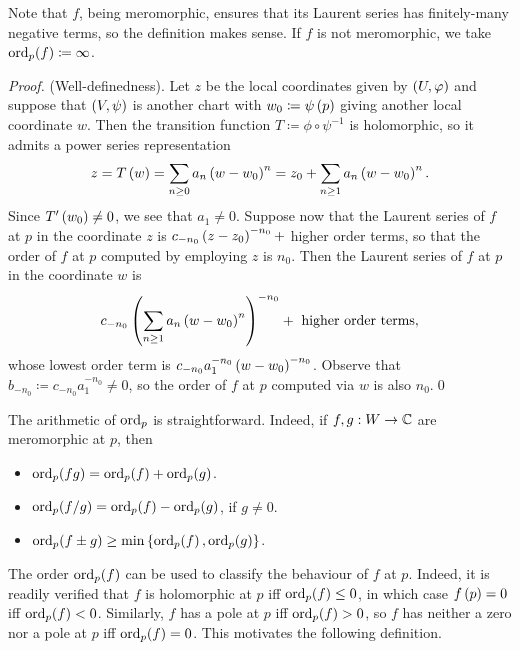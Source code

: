 \documentclass[../Moduli_Spaces_of_Riemann_Surfaces.tex]{subfiles}
\begin{document}
    \begin{remark}
        Note that $f$, being meromorphic, ensures that its Laurent series has finitely-many negative terms, so the definition makes sense. If $f$ is not meromorphic, we take $\operatorname{ord}_p\!\left(f\right)\coloneqq\infty$.\exqed
    \end{remark}
    \begin{proof}
        (Well-definedness). Let $z$ be the local coordinates given by $\left(U,\varphi\right)$ and suppose that $\left(V,\psi\right)$ is another chart with $w_0\coloneqq\psi\left(p\right)$ giving another local coordinate $w$. Then the transition function $T\coloneqq\phi\circ\psi^{-1}$ is holomorphic, so it admits a power series representation
        \begin{equation*}
            z=T\left(w\right)=\sum_{n\geq0}a_n\left(w-w_0\right)^n=z_0+\sum_{n\geq1}a_n\left(w-w_0\right)^n.
        \end{equation*}
        Since $T'\left(w_0\right)\neq0$, we see that $a_1\neq0$. Suppose now that the Laurent series of $f$ at $p$ in the coordinate $z$ is $c_{-n_0}\left(z-z_0\right)^{-n_0}+$ higher order terms, so that the order of $f$ at $p$ computed by employing $z$ is $n_0$. Then the Laurent series of $f$ at $p$ in the coordinate $w$ is
        \begin{equation*}
            c_{-n_0}\left(\sum_{n\geq1}a_n\left(w-w_0\right)^n\right)^{-n_0}+\textrm{ higher order terms},
        \end{equation*}
        whose lowest order term is $c_{-n_0}a_1^{-n_0}\left(w-w_0\right)^{-n_0}$. Observe that $b_{-n_0}\coloneqq c_{-n_0}a_1^{-n_0}\neq0$, so the order of $f$ at $p$ computed via $w$ is also $n_0$.\qed
    \end{proof}
    \begin{remark}
        The arithmetic of $\operatorname{ord}_p$ is straightforward. Indeed, if $f,g:W\to\mathbb{C}$ are meromorphic at $p$, then
        \begin{itemize}
            \item $\operatorname{ord}_p\!\left(fg\right)=\operatorname{ord}_p\!\left(f\right)+\operatorname{ord}_p\!\left(g\right)$.
                \vspace{-0.05in}
            \item $\operatorname{ord}_p\!\left(f/g\right)=\operatorname{ord}_p\!\left(f\right)-\operatorname{ord}_p\!\left(g\right)$, if $g\neq0$.
                \vspace{-0.05in}
            \item $\operatorname{ord}_p\!\left(f\pm g\right)\geq\operatorname{min}\left\{\operatorname{ord}_p\!\left(f\right),\operatorname{ord}_p\!\left(g\right)\right\}$.\exqed
        \end{itemize}
        The order $\operatorname{ord}_p\!\left(f\right)$ can be used to classify the behaviour of $f$ at $p$. Indeed, it is readily verified that $f$ is holomorphic at $p$ iff $\operatorname{ord}_p\!\left(f\right)\leq0$, in which case $f\left(p\right)=0$ iff $\operatorname{ord}_p\!\left(f\right)<0$. Similarly, $f$ has a pole at $p$ iff $\operatorname{ord}_p\!\left(f\right)>0$, so $f$ has neither a zero nor a pole at $p$ iff $\operatorname{ord}_p\!\left(f\right)=0$. This motivates the following definition.\exqed
    \end{remark}
\end{document}

